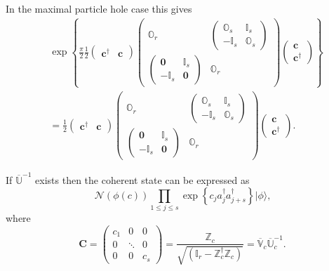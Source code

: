 \documentclass[aps, preprint]{revtex4}
\begin{document}
In the maximal particle hole case this gives
\begin{align} & \exp  \left \{\frac{\pi }{2} \frac{1}{2} \left (\begin{array}{cc}\mathbf{c}^{ \dag } & \mathbf{c}\end{array}\right ) \left (\begin{array}{cc}\mathbb{O}_{r} & \left (\begin{array}{cc}\mathbb{O}_{s} & \mathbb{I}_{s} \\
 -\mathbb{I}_{s} & \mathbb{O}_{s}\end{array}\right ) \\
\left (\begin{array}{cc}\mathbf{0} & \mathbb{I}_{s} \\
 -\mathbb{I}_{s} & \mathbf{0}\end{array}\right ) & \mathbb{O}_{r}\end{array}\right ) \left (\begin{array}{c}\mathbf{c} \\
\mathbf{c}^{ \dag }\end{array}\right )\right \} \\
 &  =\frac{1}{2} \left (\begin{array}{cc}\mathbf{c}^{ \dag } & \mathbf{c}\end{array}\right ) \left (\begin{array}{cc}\mathbb{O}_{r} & \left (\begin{array}{cc}\mathbb{O}_{s} & \mathbb{I}_{s} \\
 -\mathbb{I}_{s} & \mathbb{O}_{s}\end{array}\right ) \\
\left (\begin{array}{cc}\mathbf{0} & \mathbb{I}_{s} \\
 -\mathbb{I}_{s} & \mathbf{0}\end{array}\right ) & \mathbb{O}_{r}\end{array}\right ) \left (\begin{array}{c}\mathbf{c} \\
\mathbf{c}^{ \dag }\end{array}\right )\text{.}\end{align}

If $\overline{\mathbb{U}}^{ -1}$ exists then the coherent state can be expressed as
\begin{equation}\mathcal{N} \left (\phi  \left (c\right )\right ) {\displaystyle\prod _{1 \leq j \leq s}}\exp  \left \{c_{j} a_{j}^{ \dag } a_{j +s}^{ \dag }\right \}\vert \phi  \rangle \text{,}
\end{equation}where
\begin{equation}\mathbf{C} =\left (\begin{array}{ccc}c_{1} & 0 & 0 \\
0 & \ddots  & 0 \\
0 & 0 & c_{s}\end{array}\right ) =\frac{\mathbb{Z}_{c}}{\sqrt{\left (\mathbb{I}_{r} -\mathbb{Z}_{c}^{ \dag } \mathbb{Z}_{c}\right )}} =\overline{\mathbb{V}}_{c} \overline{\mathbb{U}}_{c}^{ -1}\text{.}
\end{equation}
\end{document}
